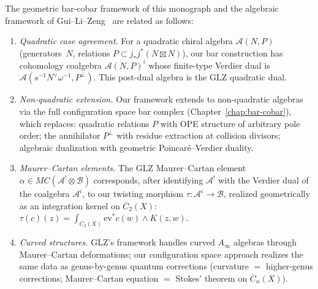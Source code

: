 \begin{proposition}
\label{prop:comparison-our-glz}
The geometric bar-cobar framework of this monograph and the algebraic
framework of Gui--Li--Zeng~\cite{GLZ22} are related as follows:
\begin{enumerate}
\item \emph{Quadratic case agreement.}
 For a quadratic chiral algebra $\mathcal{A}(N,P)$ (generators~$N$,
 relations $P \subset j_*j^*(N \boxtimes N)$), our bar construction
 has cohomology coalgebra $\mathcal{A}(N,P)^i$ whose finite-type
 Verdier dual is
 $\mathcal{A}(s^{-1}N^{\vee}\omega^{-1}, P^{\perp})$.
 This post-dual algebra is the GLZ quadratic dual.
\item \emph{Non-quadratic extension.}
 Our framework extends to non-quadratic algebras via the full
 configuration space bar complex (Chapter~\ref{chap:bar-cobar}),
 which replaces: quadratic relations $P$ with OPE structure of
 arbitrary pole order; the annihilator $P^{\perp}$ with residue
 extraction at collision divisors; algebraic dualization with
 geometric Poincar\'e--Verdier duality.
\item \emph{Maurer--Cartan elements.}
 The GLZ Maurer--Cartan element
 $\alpha \in MC(\mathcal{A}^! \otimes \mathcal{B})$
 corresponds, after identifying $\mathcal{A}^!$ with the
 Verdier dual of the coalgebra $\mathcal{A}^i$, to our twisting
 morphism
 $\tau\colon \mathcal{A}^i \to \mathcal{B}$,
 realized geometrically as an integration kernel on
 $\overline{C}_2(X)$:
 $\tau(c)(z) = \int_{\overline{C}_2(X)}
 \mathrm{ev}^* c(w) \wedge K(z, w)$.
\item \emph{Curved structures.}
 GLZ's framework handles curved $A_{\infty}$ algebras through
 Maurer--Cartan deformations; our configuration space approach
 realizes the same data as genus-by-genus quantum corrections
 (curvature $=$ higher-genus corrections; Maurer--Cartan equation
 $=$ Stokes' theorem on $\overline{C}_n(X)$).
\end{enumerate}
\end{proposition}

